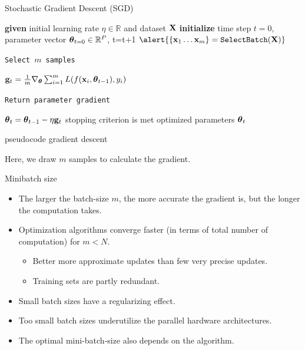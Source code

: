 \documentclass[handout,xcolor=pdftex,dvipsnames,table,mathserif]{beamer}
\begin{document}
\begin{frame}{Stochastic Gradient Descent (SGD) \cite{robbins1985stochastic}}
\begin{algorithm}[H]
\begin{algorithmic}[1]
\STATE \textbf{given} initial learning rate $\eta \in \mathbb{R}$ and dataset $\mathbf{X}$
\STATE \textbf{initialize} time step $t=0$, parameter vector $\boldsymbol{\theta}_{t=0} \in \mathbb{R}^P$,
\REPEAT
\STATE t=t+1
\STATE $\alert{\{\x_1 \ldots \x_m\}=\texttt{SelectBatch} (\X)}$ \begin{tiny}\texttt{Select $m$ samples} \end{tiny}
\STATE $\mathbf{g}_t = \frac{1}{m} \nabla_{\boldsymbol{\theta}} \sum_{i=1}^m L(f(\mathbf{x}_i,\boldsymbol{\theta}_{t-1}), y_i)$  \begin{tiny}\texttt{Return parameter gradient}\end{tiny}
\STATE $\boldsymbol{\theta}_t=\boldsymbol{\theta}_{t-1}  - \eta \mathbf{g}_t$
\UNTIL stopping criterion is met
\RETURN optimized parameters $\boldsymbol{\theta}_t$
\end{algorithmic}
\caption{pseudocode gradient descent }
\label{alg:SGD}
\end{algorithm}
Here, we draw $m$ samples to calculate the gradient. 
\end{frame}

\begin{frame}{Minibatch size}
\begin{itemize}
	\item The larger the batch-size $m$, the more accurate the gradient is, but the longer the computation takes. 
	\item Optimization algorithms converge faster (in terms of total number of computation) for $m<N$.
	\begin{itemize}
		\item Better more approximate updates than few very precise updates.
		\item Training sets are partly redundant. 
	\end{itemize}
	\item Small batch sizes have a regularizing effect. 
	\item Too small batch sizes underutilize the parallel hardware architectures.
	\item The optimal mini-batch-size also depends on the algorithm. 
\end{itemize}
\end{frame}
\end{document}

